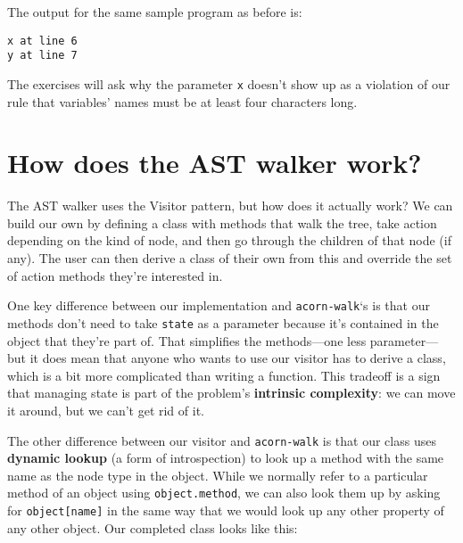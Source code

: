 \documentclass[krantzl]{krantz}
\newcommand{\glossref}[1]{\textbf{#1}}
\begin{document}
The output for the same sample program as before is:


\begin{lstlisting}[frame=tblr,backgroundcolor=\color{black!5}]
x at line 6
y at line 7
\end{lstlisting}



\noindent The exercises will ask why the parameter \texttt{x} doesn’t show up
as a violation of our rule
that variables’ names must be at least four characters long.

\section{How does the AST walker work?}\label{style-checker-walker}


The AST walker uses the Visitor pattern,
but how does it actually work?
We can build our own by defining a class with methods that walk the tree,
take action depending on the kind of node,
and then go through the children of that node (if any).
The user can then derive a class of their own from this
and override the set of action methods they’re interested in.


One key difference between our implementation and \texttt{acorn-walk}‘s is that
our methods don’t need to take \texttt{state} as a parameter
because it’s contained in the object that they’re part of.
That simplifies the methods—one less parameter—but it does mean that
anyone who wants to use our visitor has to derive a class,
which is a bit more complicated than writing a function.
This tradeoff is a sign that managing state is part of the problem’s
\glossref{intrinsic complexity}:
we can move it around,
but we can’t get rid of it.


The other difference between our visitor and \texttt{acorn-walk} is that
our class uses \glossref{dynamic lookup}
(a form of introspection)
to look up a method
with the same name as the node type in the object.
While we normally refer to a particular method of an object using \texttt{object.method},
we can also look them up by asking for \texttt{object[name]}
in the same way that we would look up any other property of any other object.
Our completed class looks like this:
\end{document}
